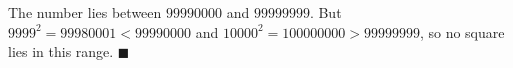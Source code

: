 The number lies between $99990000$ and $99999999$. But $9999^2=99980001<99990000$ and $10000^2=100000000>99999999$, so no square lies in this range. $\blacksquare$
